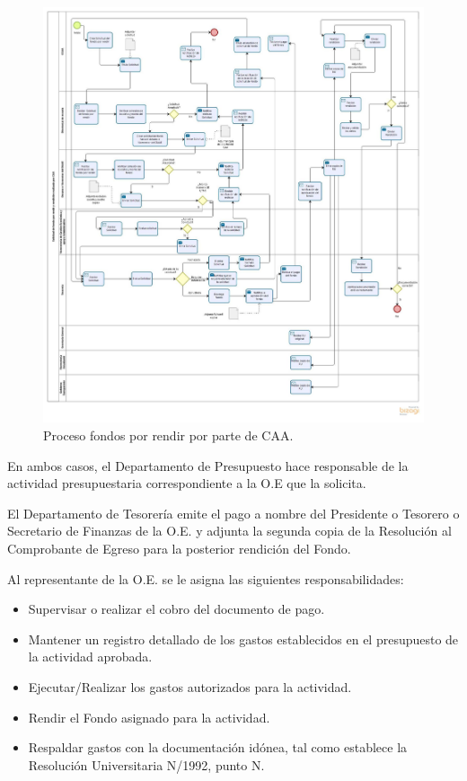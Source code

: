 \begin{figure}[p!]
	\includegraphics[width=\textwidth]{Imagenes/Solicitud_CCAA.jpg}
	\caption{\label{fig: Solicitud_CAA}Proceso fondos por rendir por parte de CAA.}
\end{figure}

En ambos casos, el Departamento de Presupuesto hace responsable de la actividad presupuestaria correspondiente a la O.E que la solicita.

El Departamento de Tesorería emite el pago a nombre del Presidente o Tesorero o Secretario de Finanzas de la O.E. y adjunta la segunda copia de la Resolución al Comprobante de Egreso para la posterior rendición del Fondo.

Al representante de la O.E. se le asigna las siguientes responsabilidades:

\begin{itemize}
	\item Supervisar o realizar el cobro del documento de pago.
	\item Mantener un registro detallado de los gastos establecidos en el presupuesto de la actividad aprobada.
	\item Ejecutar/Realizar los gastos autorizados para la actividad.
	\item Rendir el Fondo asignado para la actividad.
	\item Respaldar gastos con la documentación idónea, tal como establece la Resolución Universitaria N/1992, punto N. 
\end{itemize} 

